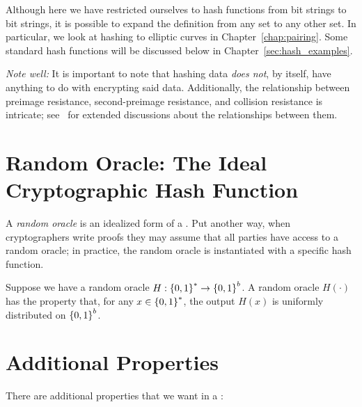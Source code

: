 Although here we have restricted ourselves to \glspl{hash function}
from bit strings to bit strings,
it is possible to expand the definition from any \gls{set} to
any other \gls{set}.
In particular, we look at hashing to \glspl{elliptic curve} in
Chapter~\ref{chap:pairing}.
Some standard \glspl{hash function} will be discussed below
in Chapter~\ref{sec:hash_examples}.

\emph{Note well:} It is important to note that hashing data
\emph{does not}, by itself, have anything to do with encrypting
said data.
Additionally, the relationship between preimage resistance,
second-preimage resistance, and collision resistance is intricate;
see~\cite{cryptoeprint:2004:035,cryptoeprint:2019/492}
for extended discussions about
the relationships between them.



\section{Random Oracle: The Ideal Cryptographic Hash Function}
\label{sec:random_oracle}

A \emph{\gls{random oracle}} is an idealized form of a
.
Put another way, when cryptographers write proofs they may
assume that all parties have access to a \gls{random oracle};
in practice, the \gls{random oracle} is instantiated with a specific
\gls{hash function}.

Suppose we have a \gls{random oracle} $H:\left\{ 0,1 \right\}^{*}\to\left\{ 0,1 \right\}^{b}$.
A \gls{random oracle} $H(\cdot)$ has the property that,
for any $x\in\left\{ 0,1 \right\}^{*}$,
the output $H(x)$ is uniformly distributed on $\left\{ 0,1 \right\}^{b}$.



\section{Additional Properties}
\label{sec:additional_hash_properties}

There are additional properties that we want in a :

